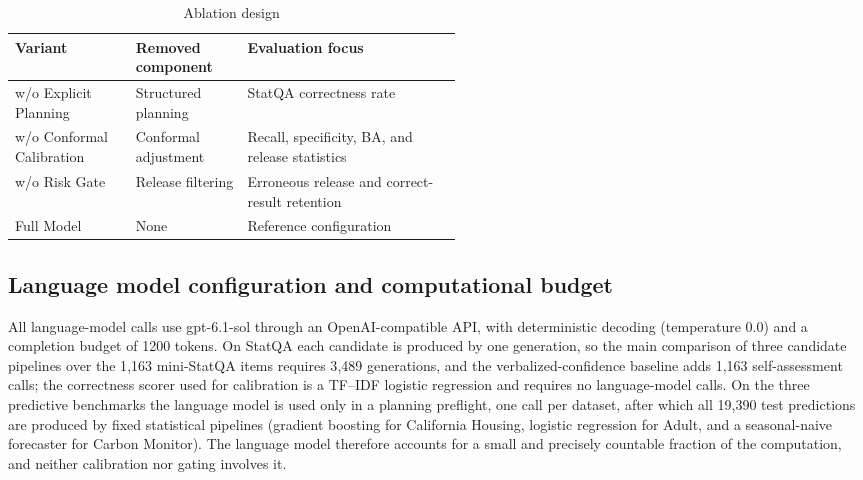 \documentclass[preprint,12pt,authoryear]{elsarticle}
\begin{document}
\begin{table}[H]
    \centering
    \caption{Ablation design}
    \label{tab:ablation_design}
    \small
    \renewcommand{\arraystretch}{1.2}

    \begin{tabularx}{\linewidth}{
        @{}
        >{\raggedright\arraybackslash}p{0.27\linewidth}
        >{\raggedright\arraybackslash}p{0.25\linewidth}
        >{\raggedright\arraybackslash}X
        @{}
    }
        \toprule
        \textbf{Variant}
        & \textbf{Removed component}
        & \textbf{Evaluation focus} \\
        \midrule

        w/o Explicit Planning
        & Structured planning
        & StatQA correctness rate \\

        w/o Conformal Calibration
        & Conformal adjustment
        & Recall, specificity, BA, and release statistics \\

        w/o Risk Gate
        & Release filtering
        & Erroneous release and correct-result retention \\

        Full Model
        & None
        & Reference configuration \\

        \bottomrule
    \end{tabularx}
\end{table}

\subsection{Language model configuration and computational budget}
\label{sec:llm_configuration}

All language-model calls use gpt-6.1-sol through an OpenAI-compatible API, with deterministic decoding (temperature 0.0) and a completion budget of 1200 tokens. On StatQA each candidate is produced by one generation, so the main comparison of three candidate pipelines over the 1{,}163 mini-StatQA items requires 3{,}489 generations, and the verbalized-confidence baseline adds 1{,}163 self-assessment calls; the correctness scorer used for calibration is a TF--IDF logistic regression and requires no language-model calls. On the three predictive benchmarks the language model is used only in a planning preflight, one call per dataset, after which all 19{,}390 test predictions are produced by fixed statistical pipelines (gradient boosting for California Housing, logistic regression for Adult, and a seasonal-naive forecaster for Carbon Monitor). The language model therefore accounts for a small and precisely countable fraction of the computation, and neither calibration nor gating involves it.
\end{document}
